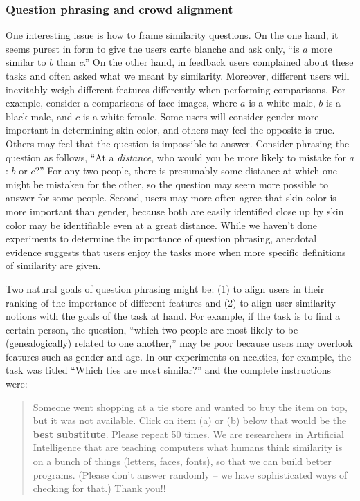\documentclass{article}
\begin{document}
\subsubsection{Question phrasing and crowd alignment}
One interesting issue is how to frame similarity questions.  On the one hand, it seems purest in form to give the users carte blanche and ask only, ``is $a$ more similar to $b$ than $c$.''  On the other hand, in feedback users complained about these tasks and often asked what we meant by similarity.  Moreover, different users will inevitably weigh different features differently when performing comparisons.  For example, consider a comparisons of face images, where $a$ is a white male, $b$ is a black male, and $c$ is a white female.  Some users will consider gender more important in determining skin color, and others may feel the opposite is true.  Others may feel that the question is impossible to answer.  Consider phrasing the question as follows, ``At a {\em distance}, who would you be more likely to mistake for $a$: $b$ or $c$?''  For any two people, there is presumably some distance at which one might be mistaken for the other, so the question may seem more possible to answer for some people.  Second, users may more often agree that skin color is more important than gender, because both are easily identified close up by skin color may be identifiable even at a great distance.  While we haven't done experiments to determine the importance of question phrasing, anecdotal evidence suggests that users enjoy the tasks more when more specific definitions of similarity are given.

Two natural goals of question phrasing might be: (1) to align users in their ranking of the importance of different features and (2) to align user similarity  notions with the goals of the task at hand.  For example, if the task is to find a certain person, the question, ``which two people are most likely to be (genealogically) related to one another,'' may be poor because users may overlook features such as gender and age.  In our experiments on neckties, for example, the task was titled ``Which ties are most similar?'' and the complete instructions were:

\begin{quote}
Someone went shopping at a tie store and wanted to buy the item
on top, but it was not available. Click on item (a) or (b) below that would be the
{\bf best substitute}. Please repeat 50 times. We are researchers in Artificial Intelligence that are teaching computers what humans think similarity is on a bunch of things (letters, faces, fonts), so that we can build better programs.  (Please
don't answer randomly -- we have sophisticated ways of checking for that.) Thank
you!!
\end{quote}
\end{document}
